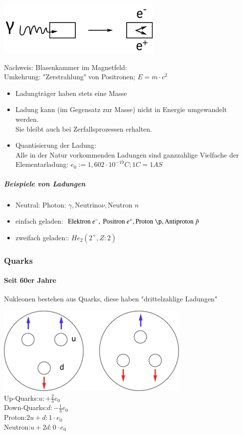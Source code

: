 \documentclass[11pt]{article}
\begin{document}
				\includegraphics{skizzen/14/14_1B2}
				
				\newpage
				
				\noindent Nachweis: Blasenkammer im Magnetfeld:  \hfill \\
				Umkehrung: "Zerstrahlung" von Positronen; $E=m\cdot c^2$
				\begin{itemize}
					\item Ladungtr\"{a}ger haben stets eine Masse
					\item Ladung kann (im Gegensatz zur Masse) nicht in Energie umgewandelt werden. \\
					      Sie bleibt auch bei Zerfallsprozessen erhalten.
					\item Quantisierung der Ladung:\\
						Alle in der Natur vorkommenden Ladungen sind ganzzahlige Vielfache der Elementarladung: $e_0:=1,602\cdot10^{-19}C; 1C=1AS$
				\end{itemize}
				\subparagraph{Beispiele von Ladungen}
				\begin{itemize}
					\item Neutral: $\text{Photon: }\gamma, \text{Neutrino}\nu, \text{Neutron }n$
					\item einfach geladen: $\text{Elektron }e^-,\text{ Positron } e^+, \text{Proton }\p, \text{Antiproton }\bar{p}$
					\item zweifach geladen:: $He_2(2^+,Z:2)$
				\end{itemize}	
				

\subsubsection{ Quarks }	
\paragraph{Seit 60er Jahre}
Nukleonen bestehen aus Quarks, diese haben "drittelzahlige Ladungen"

\includegraphics{skizzen/14/14_1B5}
\\
Up-Quarks:$u:+\frac{2}{3	}e_0$
\\
Down-Quarks:$d:-\frac{1}{3}e_0$
\\
Proton:$2u+d: 1\cdot e_0$
\\
Neutron:$u+2d: 0\cdot e_0$
\\
\end{document}
